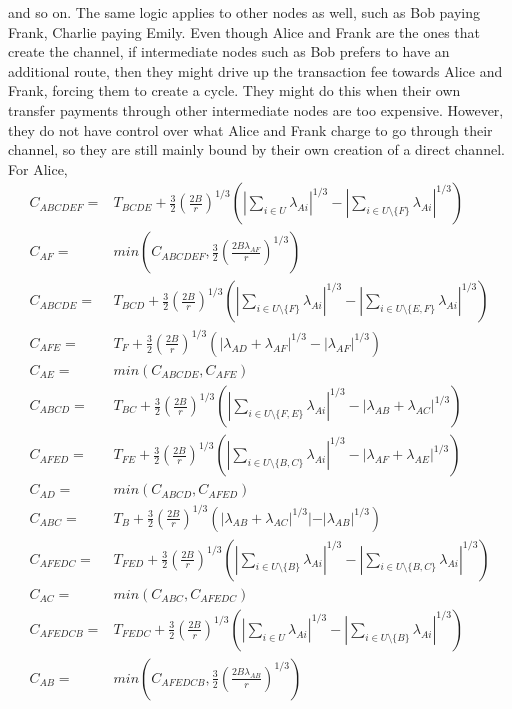 \documentclass[12pt]{article}
\theoremstyle{plain}
\theoremstyle{remark}
\theoremstyle{definition}
\begin{document}
and so on. The same logic applies to other nodes as well, such as Bob paying Frank, Charlie paying Emily. Even though Alice and Frank are the ones that create the channel, if intermediate nodes such as Bob prefers to have an additional route, then they might drive up the transaction fee towards Alice and Frank, forcing them to create a cycle. They might do this when their own transfer payments through other intermediate nodes are too expensive. However, they do not have control over what Alice and Frank charge to go through their channel, so they are still mainly bound by their own creation of a direct channel. 
\\ For Alice, 
\begin{align}
  C_{ABCDEF} =& T_{BCDE}+\frac{3}{2}(\frac{2B}{r})^{1/3}(|\sum_{i\in U}\lambda_{Ai}|^{1/3}-|\sum_{i\in U\setminus\{F\}}\lambda_{Ai}|^{1/3})\\
  C_{AF} =& min(C_{ABCDEF}, \frac{3}{2}(\frac{2B\lambda_{AF}}{r})^{1/3})\\
  C_{ABCDE} = &T_{BCD}+ \frac{3}{2}(\frac{2B}{r})^{1/3}(|\sum_{i\in U\setminus\{F\}}\lambda_{Ai}|^{1/3}-|\sum_{i\in U\setminus\{E,F\}}\lambda_{Ai}|^{1/3})\\
  C_{AFE} = &T_{F}+ \frac{3}{2}(\frac{2B}{r})^{1/3}(|\lambda_{AD}+\lambda_{AF}|^{1/3}-|\lambda_{AF}|^{1/3})\\
  C_{AE} =& min(C_{ABCDE},C_{AFE})\\
  C_{ABCD} = &T_{BC}+ \frac{3}{2}(\frac{2B}{r})^{1/3}(|\sum_{i\in U\setminus\{F,E\}}\lambda_{Ai}|^{1/3}-|\lambda_{AB}+\lambda_{AC}|^{1/3})\\
  C_{AFED} = &T_{FE}+ \frac{3}{2}(\frac{2B}{r})^{1/3}(|\sum_{i\in U\setminus\{B,C\}}\lambda_{Ai}|^{1/3}-|\lambda_{AF}+\lambda_{AE}|^{1/3})\\
  C_{AD} =& min(C_{ABCD},C_{AFED})\\
  C_{ABC} = &T_{B}+ \frac{3}{2}(\frac{2B}{r})^{1/3}(|\lambda_{AB}+\lambda_{AC}|^{1/3}|-|\lambda_{AB}|^{1/3})\\
  C_{AFEDC} = &T_{FED}+ \frac{3}{2}(\frac{2B}{r})^{1/3}(|\sum_{i\in U\setminus\{B\}}\lambda_{Ai}|^{1/3}-|\sum_{i\in U\setminus\{B,C\}}\lambda_{Ai}|^{1/3})\\
  C_{AC} =& min(C_{ABC},C_{AFEDC})\\
  C_{AFEDCB} =& T_{FEDC}+\frac{3}{2}(\frac{2B}{r})^{1/3}(|\sum_{i\in U}\lambda_{Ai}|^{1/3}-|\sum_{i\in U\setminus\{B\}}\lambda_{Ai}|^{1/3})\\
  C_{AB} =& min(C_{AFEDCB}, \frac{3}{2}(\frac{2B\lambda_{AB}}{r})^{1/3})
\end{align}
\end{document}
